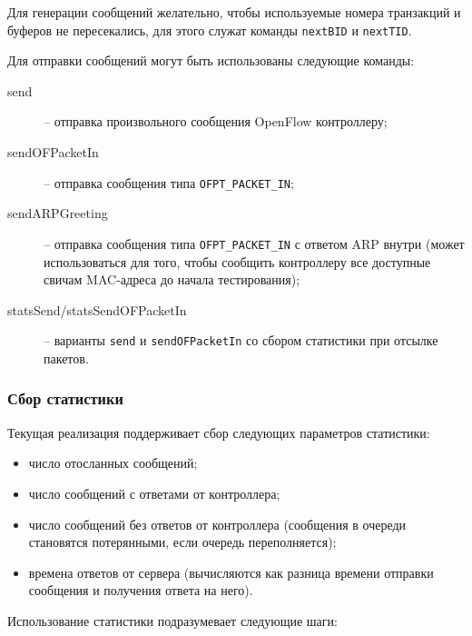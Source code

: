 \documentclass[9pt,a4paper]{article}
\begin{document}
Для генерации сообщений желательно, чтобы используемые номера транзакций и
буферов не пересекались, для этого служат команды \lstinline!nextBID! и
\lstinline!nextTID!.

Для отправки сообщений могут быть использованы следующие команды:

\begin{description}

  \item[send] -- отправка произвольного сообщения OpenFlow контроллеру;

  \item[sendOFPacketIn] -- отправка сообщения типа \lstinline!OFPT_PACKET_IN!;

  \item[sendARPGreeting] -- отправка сообщения типа \lstinline!OFPT_PACKET_IN!
    с ответом ARP внутри (может использоваться для того, чтобы сообщить
    контроллеру все доступные свичам MAC-адреса до начала тестирования);

  \item[statsSend/statsSendOFPacketIn] -- варианты \lstinline!send! и
    \lstinline!sendOFPacketIn! со сбором статистики при отсылке пакетов.

\end{description}

\subsubsection{Сбор статистики}

Текущая реализация поддерживает сбор следующих параметров статистики:

\begin{itemize}
  \item число отосланных сообщений;
  \item число сообщений с ответами от контроллера;
  \item число сообщений без ответов от контроллера (сообщения в очереди
    становятся потерянными, если очередь переполняется);
  \item времена ответов от сервера (вычисляются как разница времени отправки
    сообщения и получения ответа на него).
\end{itemize}

Использование статистики подразумевает следующие шаги:
\end{document}
